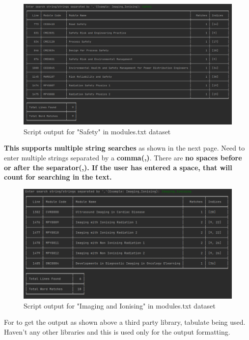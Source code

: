 \documentclass[12pt]{article}
\begin{document}
\begin{figure}[h]
\centering
\includegraphics[width=14cm]{./images/output-ss-single-input.png}
\caption{Script output for "Safety" in modules.txt dataset}\label{output1}
\end{figure}

\textbf{This supports multiple string searches} as shown in the next page.
Need to enter multiple strings separated by a \textbf{comma(,)}. There are \textbf{no spaces before or after the separator(,). If the user has entered a space, that will count for searching in the text.}

\begin{figure}[h]
\centering
\includegraphics[width=14cm]{./images/output-ss-multi-input.png}
\caption{Script output for "Imaging and Ionising" in modules.txt dataset}\label{output1}
\end{figure}

\newpage

For to get the output as shown above a third party library, tabulate being used. Haven't any other libraries and this is used only for the output formatting.
\end{document}
